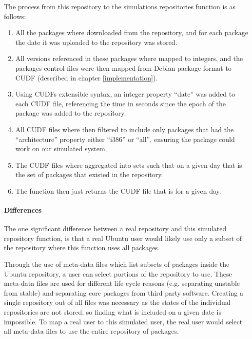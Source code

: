 The process from this repository to the simulations repositories function is as follows:
\begin{enumerate}
  \item All the packages where downloaded from the repository, and for each package the date it was uploaded to the repository was stored.  
  \item All versions referenced in these packages where mapped to integers, and the packages control files were then mapped from Debian package format to CUDF (described in chapter \ref{implementation}).
  \item Using CUDFs extensible syntax, an integer property ``date'' was added to each CUDF file, referencing the time in seconds since the epoch of the package was added to the repository.
  \item All CUDF files where then filtered to include only packages that had the ``architecture'' property either ``i386'' or ``all'', ensuring the package could work on our simulated system.
  \item The CUDF files where aggregated into sets such that on a given day that is the set of packages that existed in the repository.
  \item The function then just returns the CUDF file that is for a given day.
\end{enumerate}

\paragraph{Differences}
The one significant difference between a real repository and this simulated repository function,
is that a real Ubuntu user would likely use only a subset of the repository where this function uses all packages. 

Through the use of meta-data files which list subsets of packages inside the Ubuntu repository, a user can select portions of the repository to use.
These meta-data files are used for different life cycle reasons (e.g. separating unstable from stable) and separating core packages from third party software.
Creating a single repository out of all files was necessary as the states of the individual repositories are not stored,
so finding what is included on a given date is impossible.
To map a real user to this simulated user, the real user would select all meta-data files to use the entire repository of packages. 

